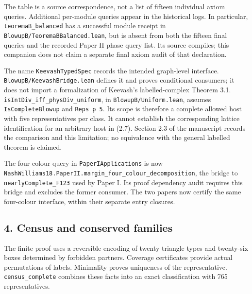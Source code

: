 \documentclass[english,11pt,a4paper]{article}
\begin{document}
The table is a source correspondence, not a list of fifteen individual axiom queries. Additional per-module queries appear in the historical logs. In particular, \texttt{teorema\allowbreak{}B\_\allowbreak{}bal\allowbreak{}anced} has a successful module receipt in \texttt{Blowup\allowbreak{}B/\allowbreak{}Teor\allowbreak{}ema\allowbreak{}BBalanced\allowbreak{}.\allowbreak{}lean}, but is absent from both the fifteen final queries and the recorded Paper II phase query list. Its source compiles; this companion does not claim a separate final axiom audit of that declaration.

The name \texttt{Keevash\allowbreak{}Typed\allowbreak{}\allowbreak{}Spec} records the intended graph-level interface. \texttt{Blowup\allowbreak{}B/\allowbreak{}Keev\allowbreak{}ash\allowbreak{}Bridge.\allowbreak{}le\allowbreak{}an} defines it and proves conditional consumers; it does not import a formalization of Keevash's labelled-complex Theorem 3.1. \texttt{is\allowbreak{}Int\allowbreak{}Div\_\allowbreak{}iff\allowbreak{}\_\allowbreak{}phys\allowbreak{}Div\_\allowbreak{}uni\allowbreak{}form}, in \texttt{Blowup\allowbreak{}B/\allowbreak{}Unif\allowbreak{}orm.\allowbreak{}lean}, assumes \texttt{Is\allowbreak{}Complete\allowbreak{}Bl\allowbreak{}owup} and \texttt{Reps p 5}. Its scope is therefore a complete allowed host with five representatives per class. It cannot establish the corresponding lattice identification for an arbitrary host in (2.7). Section 2.3 of the manuscript records the comparison and this limitation; no equivalence with the general labelled theorem is claimed.

The four-colour query in \texttt{Paper\allowbreak{}IApplic\allowbreak{}ations} is now \texttt{Nash\allowbreak{}Williams\allowbreak{}18.\allowbreak{}Paper\allowbreak{}II.\allowbreak{}m\allowbreak{}argin\_\allowbreak{}four\_\allowbreak{}c\allowbreak{}olour\_\allowbreak{}decomp\allowbreak{}osition}, the bridge to \texttt{nearly\allowbreak{}Comple\allowbreak{}te\_\allowbreak{}F123} used by Paper I. Its proof dependency audit requires this bridge and excludes the former consumer. The two papers now certify the same four-colour interface, within their separate entry closures.


\subsection{4. Census and conserved families}\label{census-and-conserved-families}

The finite proof uses a reversible encoding of twenty triangle types and twenty-six boxes determined by forbidden partners. Coverage certificates provide actual permutations of labels. Minimality proves uniqueness of the representative. \texttt{census\_\allowbreak{}compl\allowbreak{}ete} combines these facts into an exact classification with 765 representatives.
\end{document}

